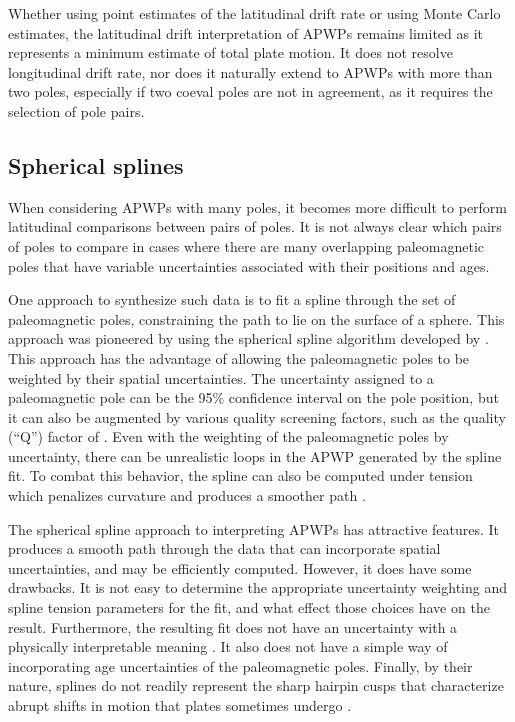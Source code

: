 \documentclass[11pt,letterpaper]{article}
\begin{document}
Whether using point estimates of the latitudinal drift rate or using Monte Carlo estimates, the latitudinal drift interpretation of APWPs remains limited as it represents a minimum estimate of total plate motion. It does not resolve longitudinal drift rate, nor does it naturally extend to APWPs with more than two poles, especially if two coeval poles are not in agreement, as it requires the selection of pole pairs.

\subsection*{Spherical splines}
When considering APWPs with many poles, it becomes more difficult to perform latitudinal comparisons between pairs of poles. It is not always clear which pairs of poles to compare in cases where there are many overlapping paleomagnetic poles that have variable uncertainties associated with their positions and ages.

One approach to synthesize such data is to fit a spline through the set of paleomagnetic poles, constraining the path to lie on the surface of a sphere. This approach was pioneered by \cite{Torsvik1992a} using the spherical spline algorithm developed by \cite{Jupp1987a}. This approach has the advantage of allowing the paleomagnetic poles to be weighted by their spatial uncertainties. The uncertainty assigned to a paleomagnetic pole can be the 95\% confidence interval on the pole position, but it can also be augmented by various quality screening factors, such as the quality (``Q'') factor of \cite{Van-der-Voo1990a} \citep{Torsvik1992a}. Even with the weighting of the paleomagnetic poles by uncertainty, there can be unrealistic loops in the APWP generated by the spline fit. To combat this behavior, the spline can also be computed under tension which penalizes curvature and produces a smoother path \citep{Torsvik1996a}.

The spherical spline approach to interpreting APWPs has attractive features. It produces a smooth path through the data that can incorporate spatial uncertainties, and may be efficiently computed. However, it does have some drawbacks. It is not easy to determine the appropriate uncertainty weighting and spline tension parameters for the fit, and what effect those choices have on the result. Furthermore, the resulting fit does not have an uncertainty with a physically interpretable meaning \citep{Torsvik1996a}. It also does not have a simple way of incorporating age uncertainties of the paleomagnetic poles. Finally, by their nature, splines do not readily represent the sharp hairpin cusps that characterize abrupt shifts in motion that plates sometimes undergo \citep{Irving1972a, Gordon1984a, Torsvik2012a}.
\end{document}
